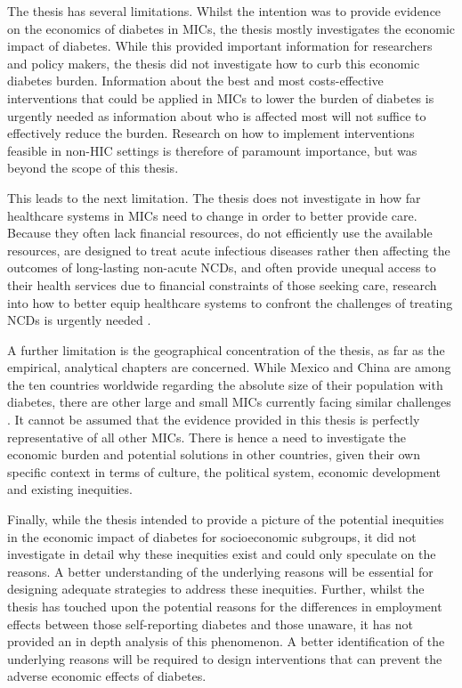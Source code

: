 The thesis has several limitations. Whilst the intention was to provide evidence on the economics of diabetes in \acp{MIC}, the thesis mostly investigates the economic impact of diabetes. While this provided important information for researchers and policy makers, the thesis did not investigate how to curb this economic diabetes burden. Information about the best and most costs-effective interventions that could be applied in \acp{MIC} to lower the burden of diabetes is urgently needed as information about who is affected most will not suffice to effectively reduce the burden. Research on how to implement interventions feasible in non-\ac{HIC} settings is therefore of paramount importance, but was beyond the scope of this thesis.

This leads to the next limitation. The thesis does not investigate in how far healthcare systems in \acp{MIC} need to change in order to better provide care. Because they often lack financial resources, do not efficiently use the available resources, are designed to treat acute infectious diseases rather then affecting the outcomes of long-lasting non-acute \acp{NCD}, and often provide unequal access to their health services due to financial constraints of those seeking care, research into how to better equip healthcare systems to confront the challenges of treating \acp{NCD} is urgently needed \parencite{Mills2014,Guzman2010}.

A further limitation is the geographical concentration of the thesis, as far as the empirical, analytical chapters are concerned. While Mexico and China are among the ten countries worldwide regarding the absolute size of their population with diabetes, there are other large and small \acp{MIC} currently facing similar challenges \parencite{Risk2016}.  It cannot be assumed that the evidence provided in this thesis is perfectly representative of all other \acp{MIC}. There is hence a need to investigate the economic burden and potential solutions in other countries, given their own specific context in terms of culture, the political system, economic development and existing inequities.

Finally, while the thesis intended to provide a picture of the potential inequities in the economic impact of diabetes for socioeconomic subgroups, it did not investigate in detail why these inequities exist and could only speculate on the reasons. A better understanding of the underlying reasons will be essential for designing adequate strategies to address these inequities. Further, whilst the thesis has touched upon the potential reasons for the differences in employment effects between those self-reporting diabetes and those unaware, it has not provided an in depth analysis of this phenomenon. A better identification of the underlying reasons will be required to design interventions that can prevent the adverse economic effects of diabetes. 



